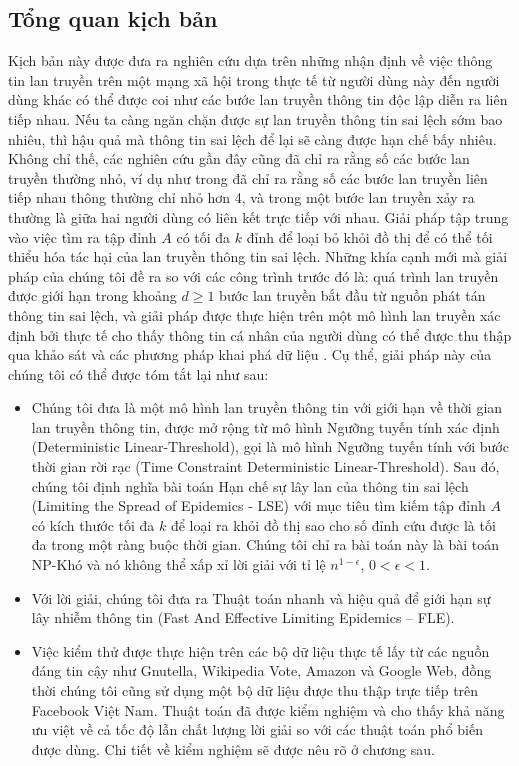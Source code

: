 	\subsection{Tổng quan kịch bản}
	Kịch bản này được đưa ra nghiên cứu dựa trên những nhận định về việc thông tin lan truyền trên một mạng xã hội trong thực tế từ người dùng này đến người dùng khác có thể được coi như các bước lan truyền thông tin độc lập diễn ra liên tiếp nhau. Nếu ta càng ngăn chặn được sự lan truyền thông tin sai lệch sớm bao nhiêu, thì hậu quả mà thông tin sai lệch để lại sẽ càng được hạn chế bấy nhiêu. Không chỉ thế, các nghiên cứu gần đây cũng đã chỉ ra rằng số các bước lan truyền thường nhỏ, ví dụ như trong \cite{cha23} đã chỉ ra rằng số các bước lan truyền liên tiếp nhau thông thường chỉ nhỏ hơn 4, và trong \cite{lesk16} một bước lan truyền xảy ra thường là giữa hai người dùng có liên kết trực tiếp với nhau.
	Giải pháp tập trung vào việc tìm ra tập đỉnh $A$ có tối đa $k$ đỉnh để loại bỏ khỏi đồ thị để có thể tối thiểu hóa tác hại của lan truyền thông tin sai lệch. Những khía cạnh mới mà giải pháp của chúng tôi đề ra so với các công trình trước đó là: quá trình lan truyền được giới hạn trong khoảng $d \geq 1$ bước lan truyền bắt đầu từ nguồn phát tán thông tin sai lệch, và giải pháp được thực hiện trên một mô hình lan truyền xác định bởi thực tế cho thấy thông tin cá nhân của người dùng có thể được thu thập qua khảo sát và các phương pháp khai phá dữ liệu \cite{zaixin}. Cụ thể, giải pháp này của chúng tôi có thể được tóm tắt lại như sau:
	\begin{itemize}
		\item Chúng tôi đưa là một mô hình lan truyền thông tin với giới hạn về thời gian lan truyền thông tin, được mở rộng từ mô hình Ngưỡng tuyến tính xác định (Deterministic Linear-Threshold), gọi là mô hình Ngưỡng tuyến tính với bước thời gian rời rạc (Time Constraint Deterministic Linear-Threshold). Sau đó, chúng tôi định nghĩa bài toán Hạn chế sự lây lan của thông tin sai lệch (Limiting the Spread of Epidemics - LSE) với mục tiêu tìm kiếm tập đỉnh $A$ có kích thước tối đa $k$ để loại ra khỏi đồ thị sao cho số đỉnh cứu được là tối đa trong một ràng buộc thời gian. Chúng tôi chỉ ra bài toán này là bài toán NP-Khó và nó không thể xấp xỉ lời giải với tỉ lệ $n^{1-\epsilon}$, $0 < \epsilon < 1$.
		\item Với lời giải, chúng tôi đưa ra Thuật toán nhanh và hiệu quả để giới hạn sự lây nhiễm thông tin (Fast And Effective Limiting Epidemics – FLE).
		\item Việc kiểm thử được thực hiện trên các bộ dữ liệu thực tế lấy từ các nguồn đáng tin cậy như Gnutella, Wikipedia Vote, Amazon và Google Web, đồng thời chúng tôi cũng sử dụng một bộ dữ liệu được thu thập trực tiếp trên Facebook Việt Nam. Thuật toán đã được kiểm nghiệm và cho thấy khả năng ưu việt về cả tốc độ lẫn chất lượng lời giải so với các thuật toán phổ biến được dùng. Chi tiết về kiểm nghiệm sẽ được nêu rõ ở chương sau.
	\end{itemize}  
